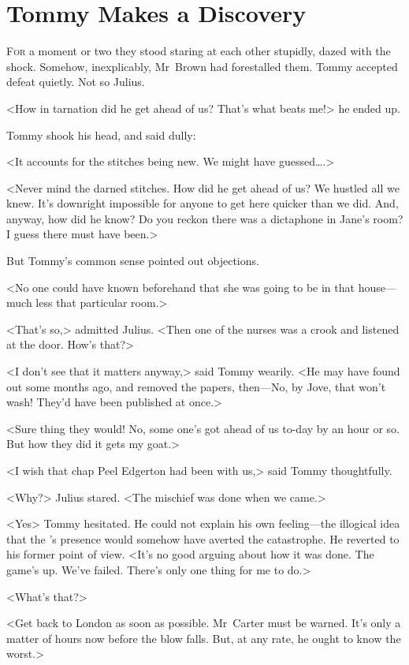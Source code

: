\chapter{Tommy Makes a Discovery} 

 \lettrine{F}{or} a moment or two they stood staring at each other stupidly, dazed with the shock. Somehow, inexplicably, Mr~Brown had forestalled them. Tommy accepted defeat quietly. Not so Julius.

\zz
<How in tarnation did he get ahead of us? That's what beats me!> he ended up.

Tommy shook his head, and said dully:

<It accounts for the stitches being new. We might have guessed\dots.>

<Never mind the darned stitches. How did he get ahead of us? We hustled all we knew. It's downright impossible for anyone to get here quicker than we did. And, anyway, how did he know? Do you reckon there was a dictaphone in Jane's room? I guess there must have been.>

But Tommy's common sense pointed out objections.

<No one could have known beforehand that she was going to be in that house—much less that particular room.>

<That's so,> admitted Julius. <Then one of the nurses was a crook and listened at the door. How's that?>

<I don't see that it matters anyway,> said Tommy wearily. <He may have found out some months ago, and removed the papers, then—No, by Jove, that won't wash! They'd have been published at once.>

<Sure thing they would! No, some one's got ahead of us to-day by an hour or so. But how they did it gets my goat.>

<I wish that chap Peel Edgerton had been with us,> said Tommy thoughtfully.

<Why?> Julius stared. <The mischief was done when we came.>

<Yes\longdash> Tommy hesitated. He could not explain his own feeling—the illogical idea that the 's presence would somehow have averted the catastrophe. He reverted to his former point of view. <It's no good arguing about how it was done. The game's up. We've failed. There's only one thing for me to do.>

<What's that?>

<Get back to London as soon as possible. Mr~Carter must be warned. It's only a matter of hours now before the blow falls. But, at any rate, he ought to know the worst.>

